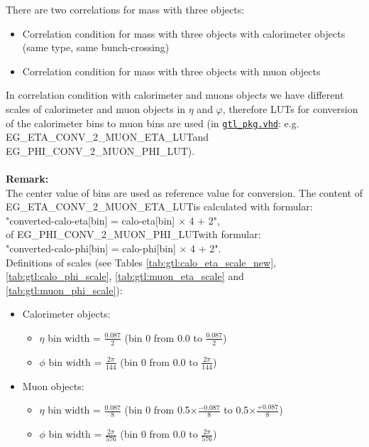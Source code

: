 There are two correlations for mass with three objects:
\begin{itemize}
\item Correlation condition for mass with three objects with calorimeter objects (same type, same bunch-crossing)\\
\item Correlation condition for mass with three objects with muon objects\\
\end{itemize}

In correlation condition with calorimeter and muons objects we have different scales of calorimeter and muon objects in $\eta$ and $\varphi$, therefore LUTs for conversion of the calorimeter bins to muon bins are used (in \href{\gitbranch/firmware/hdl/packages/gtl_pkg.vhd}{\texttt{\textquotesingle gtl\_pkg.vhd\textquotesingle }}:
 e.g. \small{EG\_ETA\_CONV\_2\_MUON\_ETA\_LUT}\normalsize  and \small{EG\_PHI\_CONV\_2\_MUON\_PHI\_LUT}\normalsize).\\\\
\textbf{Remark:}\\
The center value of bins are used as reference value for conversion.
The content of \small{EG\_ETA\_CONV\_2\_MUON\_ETA\_LUT}\normalsize is calculated with formular:\\ "converted-calo-eta[bin] = calo-eta[bin] $\times$ 4 + 2",\\
of \small{EG\_PHI\_CONV\_2\_MUON\_PHI\_LUT}\normalsize with formular:\\
"converted-calo-phi[bin] = calo-phi[bin] $\times$ 4 + 2".\\
Definitions of scales (see Tables \ref{tab:gtl:calo_eta_scale_new}, \ref{tab:gtl:calo_phi_scale}, \ref{tab:gtl:muon_eta_scale} and \ref{tab:gtl:muon_phi_scale}):
\begin{itemize}
\item Calorimeter objects:
    \begin{itemize}
    \item $\eta$ bin width = $\frac{0.087}{2}$ (bin 0 from 0.0 to $\frac{0.087}{2}$)
    \item $\phi$ bin width = $\frac{2\pi}{144}$ (bin 0 from 0.0 to $\frac{2\pi}{144}$)
    \end{itemize}
\item Muon objects:
    \begin{itemize}
    \item $\eta$ bin width = $\frac{0.087}{8}$ (bin 0 from \small{0.5}$\times\frac{-0.087}{8}$ to \small{0.5}$\times\frac{+0.087}{8}$)
    \item $\phi$ bin width = $\frac{2\pi}{576}$ (bin 0 from 0.0 to $\frac{2\pi}{576}$)
    \end{itemize}
\end{itemize}

